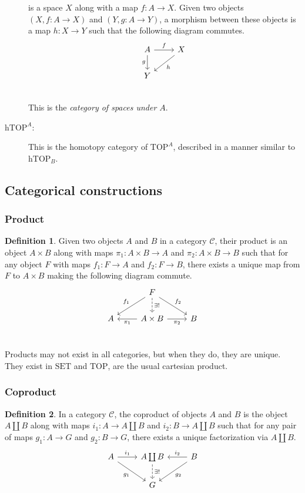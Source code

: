 \documentclass[12pt, notitlepage]{article}
\theoremstyle{definition}
\newtheorem{defn}{Definition}[section]
\newcommand{\cat}[1]{\mathrm{#1}}
\begin{document}
\begin{description}
  is a space $X$ along with a map $f: A \to X$. Given two objects $(X, f: A \to X)$ and
  $(Y, g: A \to Y)$, a morphism between these objects is a map $h: X \to Y$ such that the following
  diagram commutes.
  \[
    \begin{tikzcd}
      A \arrow{r}{f} \arrow[swap]{d}{g} & X \ar{dl}{h}  \\
      Y & \\
    \end{tikzcd}
  \]
  This is the \emph{category of spaces under $A$}.
\item[$\cat{hTOP}^A$:] This is the homotopy category of $\cat{TOP}^A$, described in a manner similar
  to $\cat{hTOP}_B$.
\end{description}

\subsection{Categorical constructions}
\subsubsection{Product}

\begin{defn}
  Given two objects $A$ and $B$ in a category $\mathcal{C}$, their product is an object $A \times B$
  along with maps $\pi_1 : A \times B \to A$ and $\pi_2 : A \times B \to B$ such that for any object
  $F$ with maps $f_1 : F \to A$ and $f_2: F \to B$, there exists a unique map from $F$ to
  $A \times B$ making the following diagram commute.
  \[
    \begin{tikzcd}
      &      F \arrow[swap]{dl}{f_1} \arrow{dr}{f_2} \arrow[dashed]{d}{\exists !}     & \\
      A & A \times B \arrow{l}{\pi_1} \arrow[swap]{r}{\pi_2}  & B \\
    \end{tikzcd}
  \]
\end{defn}

Products may not exist in all categories, but when they do, they are unique.  They exist in
$\cat{SET}$ and $\cat{TOP}$, are the usual cartesian product.

\subsubsection{Coproduct}

\begin{defn}
  In a category $\mathcal{C}$, the coproduct of objects $A$ and $B$ is the object $A \coprod B$
  along with maps $i_1: A \to A \coprod B$ and $i_2: B \to A \coprod B$ such that for any pair of
  maps $g_1 : A \to G$ and $g_2: B \to G$, there exists a unique factorization via $A \coprod B$.
  \[
    \begin{tikzcd}
      A \ar{r}{i_1} \ar[swap]{dr}{g_1} & A \coprod B \ar[dashed]{d}{\exists !} & B \ar[swap]{l}{i_2} \ar{dl}{g_2} \\
      & G & \\
    \end{tikzcd}
  \]
\end{defn}
\end{document}
